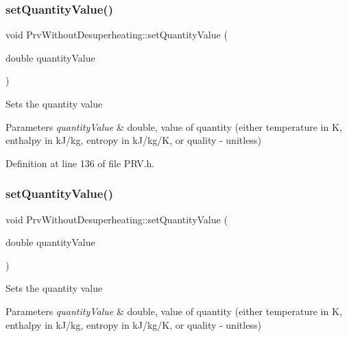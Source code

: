 \subsubsection{\texorpdfstring{set\+Quantity\+Value()}{setQuantityValue()}\hspace{0.1cm}{\footnotesize\ttfamily [2/3]}}
{\footnotesize\ttfamily void Prv\+Without\+Desuperheating\+::set\+Quantity\+Value (\begin{DoxyParamCaption}\item[{double}]{quantity\+Value }\end{DoxyParamCaption})\hspace{0.3cm}{\ttfamily [inline]}}

Sets the quantity value


\begin{DoxyParams}{Parameters}
{\em quantity\+Value} & double, value of quantity (either temperature in K, enthalpy in k\+J/kg, entropy in k\+J/kg/K, or quality -\/ unitless) \\
\hline
\end{DoxyParams}


Definition at line 136 of file P\+R\+V.\+h.

\mbox{\label{class_prv_without_desuperheating_a5ed2d0f0f558705d482ed0502131757f}} 
\subsubsection{\texorpdfstring{set\+Quantity\+Value()}{setQuantityValue()}\hspace{0.1cm}{\footnotesize\ttfamily [3/3]}}
{\footnotesize\ttfamily void Prv\+Without\+Desuperheating\+::set\+Quantity\+Value (\begin{DoxyParamCaption}\item[{double}]{quantity\+Value }\end{DoxyParamCaption})\hspace{0.3cm}{\ttfamily [inline]}}

Sets the quantity value


\begin{DoxyParams}{Parameters}
{\em quantity\+Value} & double, value of quantity (either temperature in K, enthalpy in k\+J/kg, entropy in k\+J/kg/K, or quality -\/ unitless) \\
\hline
\end{DoxyParams}


